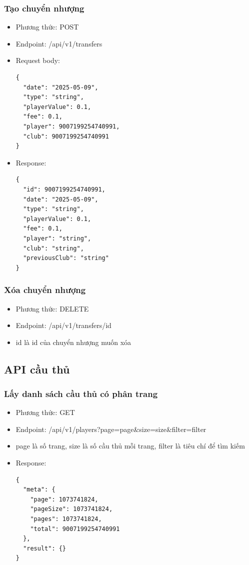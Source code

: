 \documentclass[../BTL.tex]{subfiles}
\begin{document}
\subsubsection{ Tạo chuyển nhượng}
\begin{itemize}
    \item Phương thức: POST
    \item Endpoint: /api/v1/transfers
    \item Request body: 
        \begin{verbatim}
{
  "date": "2025-05-09",
  "type": "string",
  "playerValue": 0.1,
  "fee": 0.1,
  "player": 9007199254740991,
  "club": 9007199254740991
}
        \end{verbatim}
    \item Response:
        \begin{verbatim}          
{
  "id": 9007199254740991,
  "date": "2025-05-09",
  "type": "string",
  "playerValue": 0.1,
  "fee": 0.1,
  "player": "string",
  "club": "string",
  "previousClub": "string"
}
        \end{verbatim}
\end{itemize}
\subsubsection{ Xóa chuyển nhượng}
\begin{itemize}
    \item Phương thức: DELETE
    \item Endpoint: /api/v1/transfers/{id}
    \item {id} là id của chuyển nhượng muốn xóa
\end{itemize}
\subsection{ API cầu thủ}
\subsubsection{ Lấy danh sách cầu thủ có phân trang}
\begin{itemize}
    \item Phương thức: GET
    \item Endpoint: /api/v1/players?page={page}\&size={size}\&filter={filter}
    \item {page} là số trang, {size} là số cầu thủ mỗi trang, {filter} là tiêu chí để tìm kiếm
    \item Response:
        \begin{verbatim}          
{
  "meta": {
    "page": 1073741824,
    "pageSize": 1073741824,
    "pages": 1073741824,
    "total": 9007199254740991
  },
  "result": {}
}
        \end{verbatim}
\end{itemize}
\end{document}
